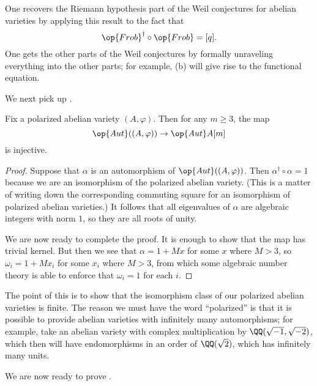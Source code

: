 \documentclass[../notes.tex]{subfiles}
\begin{document}
\begin{remark}
	One recovers the Riemann hypothesis part of the Weil conjectures for abelian varieties by applying this result to the fact that
	\[{\op{Frob}^\dagger}\circ{\op{Frob}}=[q].\]
	One gets the other parts of the Weil conjectures by formally unraveling everything into the other parts; for example, (b) will give rise to the functional equation.
\end{remark}
We next pick up \cite[Theorem~21.5]{mumford}.
\begin{theorem} \label{thm:pav-finite-aut}
	Fix a polarized abelian variety $(A,\varphi)$. Then for any $m\ge3$, the map
	\[\op{Aut}((A,\varphi))\to\op{Aut}A[m]\]
	is injective.
\end{theorem}
\begin{proof}
	Suppose that $\alpha$ is an automorphism of $\op{Aut}((A,\varphi))$. Then $\alpha^\dagger\circ\alpha=1$ because we are an isomorphism of the polarized abelian variety. (This is a matter of writing down the corresponding commuting square for an isomorphism of polarized abelian varieties.) It follows that all eigenvalues of $\alpha$ are algebraic integers with norm $1$, so they are all roots of unity.

	We are now ready to complete the proof. It is enough to show that the map has trivial kernel. But then we see that $\alpha=1+Mx$ for some $x$ where $M>3$, so $\omega_i=1+Mx_i$ for some $x_i$ where $M>3$, from which some algebraic number theory is able to enforce that $\omega_i=1$ for each $i$.
\end{proof}
\begin{remark}
	The point of this is to show that the isomorphism class of our polarized abelian varieties is finite. The reason we must have the word ``polarized'' is that it is possible to provide abelian varieties with infinitely many automorphisms; for example, take an abelian variety with complex multiplication by $\QQ(\sqrt{-1},\sqrt{-2})$, which then will have endomorphisms in an order of $\QQ(\sqrt2)$, which has infinitely many units.
\end{remark}
We are now ready to prove .
\end{document}
